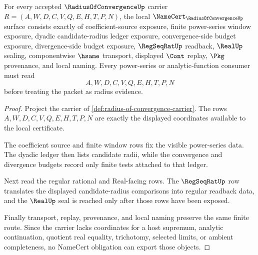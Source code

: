 \begin{theorem}
\label{thm:radius-of-convergence-namecert-obligations}
For every accepted $\RadiusOfConvergenceUp$ carrier $R=(A,W,D,C,V,Q,E,H,T,P,N)$, the local $\NameCert_{\RadiusOfConvergenceUp}$ surface consists exactly of coefficient-source exposure, finite power-series window exposure, dyadic candidate-radius ledger exposure, convergence-side budget exposure, divergence-side budget exposure, $\RegSeqRatUp$ readback, $\RealUp$ sealing, componentwise $\hsame$ transport, displayed $\Cont$ replay, $\Pkg$ provenance, and local naming. Every power-series or analytic-function consumer must read
$$
A,W,D,C,V,Q,E,H,T,P,N
$$
before treating the packet as radius evidence.
\end{theorem}
\begin{proof}
Project the carrier of \autoref{def:radius-of-convergence-carrier}. The rows $A,W,D,C,V,Q,E,H,T,P,N$ are exactly the displayed coordinates available to the local certificate.

The coefficient source and finite window rows fix the visible power-series data. The dyadic ledger then lists candidate radii, while the convergence and divergence budgets record only finite tests attached to that ledger.

Next read the regular rational and Real-facing rows. The $\RegSeqRatUp$ row translates the displayed candidate-radius comparisons into regular readback data, and the $\RealUp$ seal is reached only after those rows have been exposed.

Finally transport, replay, provenance, and local naming preserve the same finite route. Since the carrier lacks coordinates for a host supremum, analytic continuation, quotient real equality, trichotomy, selected limits, or ambient completeness, no NameCert obligation can export those objects.
\end{proof}


